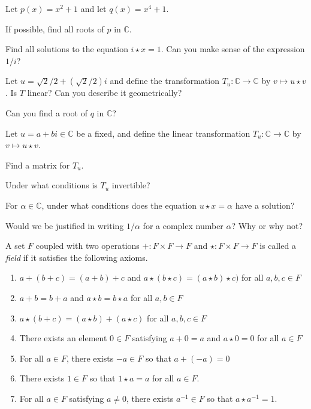 \documentclass[14pt]{problemset}
\newcommand{\C}{\mathbb{C}}
\begin{document}
	\question
	Let $p(x)=x^2+1$ and let $q(x)=x^4+1$. 
	\begin{parts}
		\item If possible, find all roots of $p$ in $\C$.
		\item Find all solutions to the equation $i\star x=1$. Can you make sense
			of the expression $1/i$?
		\item Let $u=\sqrt{2}/2+(\sqrt{2}/2)i$ and define the transformation
			$T_u:\C\to \C$ by $v\mapsto u\star v$. Is $T$ linear? Can you describe it geometrically?
		\item Can you find a root of $q$ in $\C$?
	\end{parts}

	\newpage
	\question
	Let $u=a+bi\in \C$ be a fixed, and define the linear transformation $T_u:\C\to\C$
	by $v\mapsto u\star v$.
	\begin{parts}
		\item Find a matrix for $T_u$.
		\item Under what conditions is $T_u$ invertible?
		\item For $\alpha\in\C$, under what conditions does the equation
			$u\star x=\alpha$ have a solution?
		\item Would we be justified in writing $1/\alpha$ for a complex number
			$\alpha$? Why or why not?
	\end{parts}

	\begin{definition}[Field]
		A set $F$ coupled with two operations $+:F\times F\to F$
		and $\star:F\times F\to F$ is called a \emph{field}
		if it satisfies the following axioms.
		\begin{enumerate}
			\item $a+(b+c)=(a+b)+c$ and $a\star(b\star c)=(a\star b)\star c)$ for all $a,b,c\in F$
			\item $a+b=b+a$ and $a\star b=b\star a$ for all $a,b\in F$
			\item $a\star(b+c)=(a\star b)+(a\star c)$ for all $a,b,c\in F$
			\item There exists an element $0\in F$ satisfying $a+0=a$ and $a\star 0=0$ for all
				$a\in F$
			\item For all $a\in F$, there exists $-a\in F$ so that $a+(-a)=0$
			\item There exists $1\in F$ so that $1\star a=a$ for all $a\in F$.
			\item For all $a\in F$ satisfying $a\neq 0$, there exists
				$a^{-1}\in F$ so that $a\star a^{-1}=1$.
		\end{enumerate}
	\end{definition}
\end{document}
